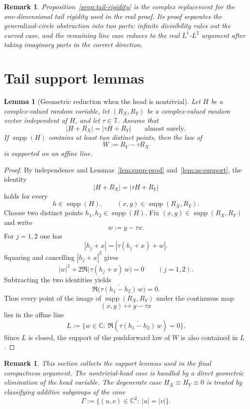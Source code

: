 \documentclass[11pt]{amsart}
\newtheorem{lemma}[theorem]{Lemma}
\newtheorem{remark}[theorem]{Remark}
\newcommand{\C}{\mathbb{C}}
\newcommand{\T}{\mathbb{T}}
\newcommand{\supp}{\operatorname{supp}}
\begin{document}
\begin{remark}
Proposition~\ref{prop:tail-rigidity} is the complex replacement for the
one-dimensional tail rigidity used in the real proof.  Its proof separates the
generalized-circle obstruction into two parts: infinite divisibility rules out
the curved case, and the remaining line case reduces to the real
$L^1$-$L^2$ argument after taking imaginary parts in the correct direction.
\end{remark}

\section{Tail support lemmas}
\label{sec:proof}

\begin{lemma}[Geometric reduction when the head is nontrivial]
\label{lem:nontrivial-head-geometry}
Let $H$ be a complex-valued random variable, let $(R_X,R_Y)$ be a
complex-valued random vector independent of $H$, and let $\tau\in\T$.  Assume
that
\[
  |H+R_X| = |\tau H + R_Y|
  \qquad\text{almost surely.}
\]
If $\supp(H)$ contains at least two distinct points, then the law of
\[
  W:=R_Y-\tau R_X
\]
is supported on an affine line.
\end{lemma}

\begin{proof}
By independence and Lemmas~\ref{lem:supp-prod} and~\ref{lem:as-support}, the
identity
\[
  |H+R_X| = |\tau H + R_Y|
\]
holds for every
\[
  h\in \supp(H),
  \qquad
  (x,y)\in \supp(R_X,R_Y).
\]
Choose two distinct points $h_1,h_2\in \supp(H)$.  Fix
$(x,y)\in \supp(R_X,R_Y)$ and write
\[
  w:=y-\tau x.
\]
For $j=1,2$ one has
\[
  |h_j+x| = |\tau(h_j+x)+w|.
\]
Squaring and cancelling $|h_j+x|^2$ gives
\[
  |w|^2 + 2\Re\bigl(\overline{\tau(h_j+x)}\,w\bigr)=0
  \qquad (j=1,2).
\]
Subtracting the two identities yields
\[
  \Re\bigl(\overline{\tau(h_1-h_2)}\,w\bigr)=0.
\]
Thus every point of the image of $\supp(R_X,R_Y)$ under the continuous map
\[
  (x,y)\mapsto y-\tau x
\]
lies in the affine line
\[
  L:=\{w\in\C:\ \Re(\overline{\tau(h_1-h_2)}\,w)=0\}.
\]
Since $L$ is closed, the support of the pushforward law of $W$ is also
contained in $L$.
\end{proof}

\begin{remark}
This section collects the support lemmas used in the final compactness
argument.  The nontrivial-head case is handled by a direct geometric
elimination of the head variable.  The degenerate case $H_X\equiv H_Y\equiv 0$
is treated by classifying additive subgroups of the cone
\[
  \Gamma:=\{(u,v)\in\C^2:\ |u|=|v|\}.
\]
\end{remark}
\end{document}
